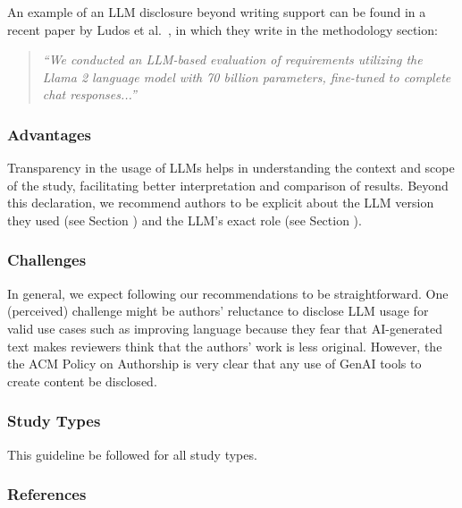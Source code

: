 An example of an LLM disclosure beyond writing support can be found in a recent paper by Ludos et al.~\cite{DBLP:conf/re/LubosFTGMEL24}, in which they write in the methodology section:

\begin{quote}
\it
``We conducted an LLM-based evaluation of requirements utilizing the Llama 2 language model with 70 billion parameters, fine-tuned to complete chat responses...''
\end{quote}


\subsubsection{Advantages}

Transparency in the usage of LLMs helps in understanding the context and scope of the study, facilitating better interpretation and comparison of results.
Beyond this declaration, we recommend authors to be explicit about the LLM version they used (see Section \modelversion) and the LLM's exact role (see Section \toolarchitecture).


\subsubsection{Challenges}

In general, we expect following our recommendations to be straightforward.
One (perceived) challenge might be authors' reluctance to disclose LLM usage for valid use cases such as improving language because they fear that AI-generated text makes reviewers think that the authors' work is less original.
However, the the ACM Policy on Authorship is very clear that any use of GenAI tools to create content \must be disclosed.


\subsubsection{Study Types}

This guideline \must be followed for all study types.


\subsubsection{References}





